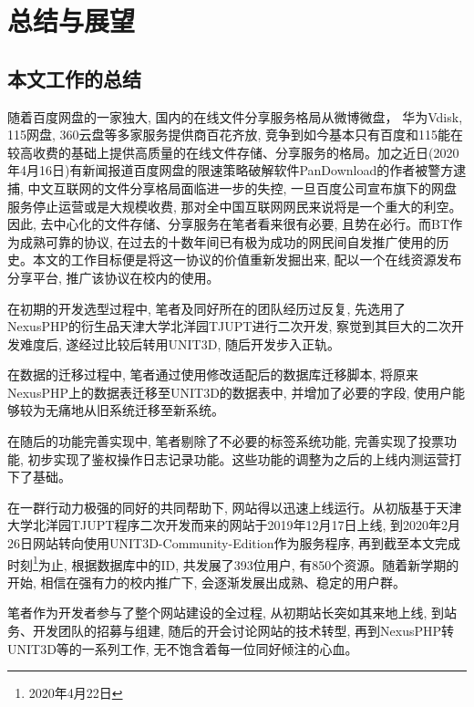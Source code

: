 
\chapter{总结与展望}


\section{本文工作的总结}

随着百度网盘的一家独大, 国内的在线文件分享服务格局从微博微盘， 华为Vdisk, 115网盘, 360云盘等多家服务提供商百花齐放, 竞争到如今基本只有百度和115能在较高收费的基础上提供高质量的在线文件存储、分享服务的格局。加之近日(2020年4月16日)有新闻报道百度网盘的限速策略破解软件PanDownload的作者被警方逮捕\cite{sina2020pandownload}, 中文互联网的文件分享格局面临进一步的失控, 一旦百度公司宣布旗下的网盘服务停止运营或是大规模收费, 那对全中国互联网网民来说将是一个重大的利空。因此, 去中心化的文件存储、分享服务在笔者看来很有必要, 且势在必行。而BT作为成熟可靠的协议, 在过去的十数年间已有极为成功的网民间自发推广使用的历史。本文的工作目标便是将这一协议的价值重新发掘出来, 配以一个在线资源发布分享平台, 推广该协议在校内的使用。

在初期的开发选型过程中, 笔者及同好所在的团队经历过反复, 先选用了NexusPHP的衍生品天津大学北洋园TJUPT进行二次开发, 察觉到其巨大的二次开发难度后, 遂经过比较后转用UNIT3D, 随后开发步入正轨。

在数据的迁移过程中, 笔者通过使用修改适配后的数据库迁移脚本, 将原来NexusPHP上的数据表迁移至UNIT3D的数据表中, 并增加了必要的字段, 使用户能够较为无痛地从旧系统迁移至新系统。

在随后的功能完善实现中, 笔者剔除了不必要的标签系统功能, 完善实现了投票功能, 初步实现了鉴权操作日志记录功能。这些功能的调整为之后的上线内测运营打下了基础。

在一群行动力极强的同好的共同帮助下, 网站得以迅速上线运行。从初版基于天津大学北洋园TJUPT程序二次开发而来的网站于2019年12月17日上线, 到2020年2月26日网站转向使用UNIT3D-Community-Edition作为服务程序, 再到截至本文完成时刻\footnote{2020年4月22日}为止, 根据数据库中的ID, 共发展了393位用户, 有850个资源。随着新学期的开始, 相信在强有力的校内推广下, 会逐渐发展出成熟、稳定的用户群。

笔者作为开发者参与了整个网站建设的全过程, 从初期站长突如其来地上线, 到站务、开发团队的招募与组建, 随后的开会讨论网站的技术转型, 再到NexusPHP转UNIT3D等的一系列工作, 无不饱含着每一位同好倾注的心血。

